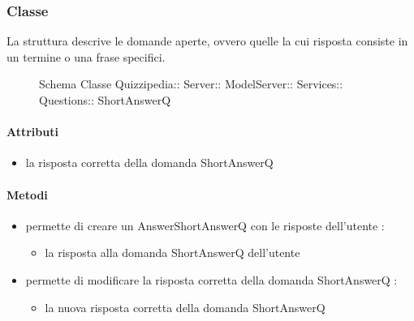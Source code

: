 \subsubsection{Classe }
La struttura descrive le domande aperte, ovvero quelle la cui risposta consiste in un termine o una frase specifici.
\begin{figure}[H]
\centering
\noindent{}
\caption[Schema Classe ShortAnswerQ]{Schema Classe Quizzipedia:: Server:: ModelServer:: Services:: Questions:: ShortAnswerQ}
\end{figure}
\paragraph{Attributi}
\begin{itemize}
\item {}
\newline
la risposta corretta della domanda ShortAnswerQ
\end{itemize}
\paragraph{Metodi}
\begin{itemize}
\item {}
\newline
permette di creare un AnswerShortAnswerQ con le risposte dell'utente
\newline
{} :
\begin{itemize}
\item {}
\newline
la risposta alla domanda ShortAnswerQ dell'utente
\end{itemize}
\item {}
\newline
permette di modificare la risposta corretta della domanda ShortAnswerQ
\newline
{} :
\begin{itemize}
\item {}
\newline
la nuova risposta corretta della domanda ShortAnswerQ
\end{itemize}
\end{itemize}

